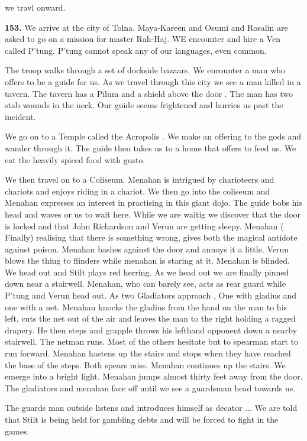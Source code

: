 \documentclass[10pt]{report}
\begin{document}
we travl onward.

{\bf 153.   } We arrive at the city of Tolna. Maya-Kareen and Osumi and Rosalin
are asked to go on a mission for master Rah-Haj. WE encounter and hire a
Ven called P'tung. P'tung cannot speak any of our languages, even
common.

The troop walks through a set of dockside bazaars. We encounter a
man who offers to be a guide for us. As we travel through this city we
see a man killed in a tavern. The tavern has a Pilum and a shield above
the door . The man has two stab wounds in the neck. Our guide seems
frightened and hurries us past the incident.

We go on to a Temple called the Acropolis . We make an offering to
the gods and wander through it. The guide then takes us to a home that
offers to feed us. We eat the heavily spiced food with gusto.

We then travel on to a Coliseum. Menahan is intrigued by charioteers
and chariots and enjoys riding in a chariot. We then go into the
coliseum and Menahan expresses an interest in practising in this giant
dojo. The guide bobs his head and waves or us to wait here. While we are
waitig we discover that the door is locked and that John Richardson and
Verun are getting sleepy. Menahan ( Finally) realising that there is
something wrong, gives both the magical antidote against poison. Menahan
bashes against the door and annoys it a little. Verun blows the thing to
flinders while menahan is staring at it. Menahan is blinded. We head out
and Stilt plays red herring. As we head out we are finally pinned down
near a stairwell. Menahan, who can barely see, acts as rear guard while
P'tung and Verun head out. As two Gladiators approach , One with gladius
and one with a net. Menahan knocks the gladius from the hand on the man
to his left, cuts the net out of the air and leaves the man to the right
holding a ragged drapery. He then steps and grapple throws his lefthand
opponent down a nearby stairwell. The netman runs. Most of the others
hesitate but to spearman start to run forward. Menahan hastens up the
stairs and stops when they have reached the base of the steps. Both
spears miss. Menahan continues up the stairs. We emerge into a bright
light. Menahan jumps almost thirty feet away from the door. The
gladiators and menahan face off until we see a guardsman head towards
us.

The guards man outside listens and introduces himself as decator ...
We are told that Stilt is being held for gambling debts and will be
forced to fight in the games.
\end{document}
